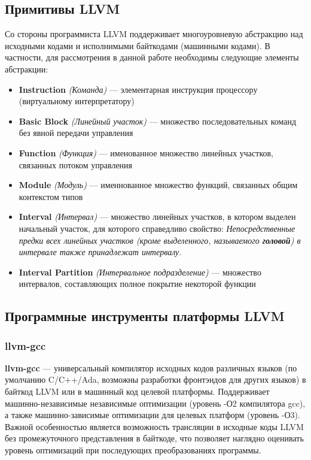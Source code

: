 \documentclass[12pt,a4paper]{article}
\begin{document}
\subsection{Примитивы LLVM}
Со стороны программиста LLVM поддерживает многоуровневую абстракцию над исходными кодами и исполнимыми байткодами (машинными кодами). В частности, для рассмотрения в данной работе необходимы следующие элементы абстракции:
\begin{itemize}
\item \textbf{Instruction} \textit{(Команда)} --- элементарная инструкция процессору (виртуальному интерпретатору)
\item \textbf{Basic Block} \textit{(Линейный участок)} --- множество последовательных команд без явной передачи управления
\item \textbf{Function} \textit{(Функция)} --- именованное множество линейных участков, связанных потоком управления
\item \textbf{Module} \textit{(Модуль)} --- именнованное множество функций, связанных общим контекстом типов
\item \textbf{Interval} \textit{(Интервал)} --- множество линейных участков, в котором выделен начальный участок, для которого справедливо свойство: \textit{Непосредственные предки всех линейных участков (кроме выделенного, называемого \textbf{головой}) в интервале также принадлежат интервалу}.
\item \textbf{Interval Partition} \textit{(Интервальное подразделение)} --- множество интервалов, составляющих полное покрытие некоторой функции
\end{itemize}

\subsection{Программные инструменты платформы LLVM}

\subsubsection{llvm-gcc}

\textbf{llvm-gcc} --- универсальный компилятор исходных кодов различных языков (по умолчанию C/C++/Ada, возможны разработки фронтэндов для других языков) в байткод LLVM или в машинный код целевой платформы. Поддерживает машинно-независимые независимые оптимизации (уровень -О2 компилятора gcc), а также машинно-зависимые оптимизации для целевых платформ (уровень -О3). Важной особенностью является возможность трансляции в исходные коды LLVM без промежуточного представления в байткоде, что позволяет наглядно оценивать уровень оптимизаций при последующих преобразованиях программы.
\end{document}
